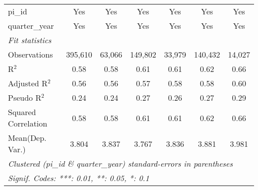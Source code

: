 \begin{tabular}{lcccccc}
   pi\_id                                                     & Yes           & Yes           & Yes           & Yes           & Yes           & Yes\\  
   quarter\_year                                              & Yes           & Yes           & Yes           & Yes           & Yes           & Yes\\  
   \midrule
   \emph{Fit statistics}\\
   Observations                                               & 395,610       & 63,066        & 149,802       & 33,979        & 140,432       & 14,027\\  
   R$^2$                                                      & 0.58          & 0.58          & 0.61          & 0.61          & 0.62          & 0.66\\  
   Adjusted R$^2$                                             & 0.56          & 0.56          & 0.57          & 0.58          & 0.58          & 0.60\\  
   Pseudo R$^2$                                               & 0.24          & 0.24          & 0.27          & 0.26          & 0.27          & 0.29\\  
   Squared Correlation                                        & 0.58          & 0.58          & 0.61          & 0.61          & 0.62          & 0.66\\  
Mean(Dep. Var.) & 3.804 & 3.837 & 3.767 & 3.836 & 3.881 & 3.981 \\
   \midrule \midrule
   \multicolumn{7}{l}{\emph{Clustered (pi\_id \& quarter\_year) standard-errors in parentheses}}\\
   \multicolumn{7}{l}{\emph{Signif. Codes: ***: 0.01, **: 0.05, *: 0.1}}\\
\end{tabular}
\par\endgroup

